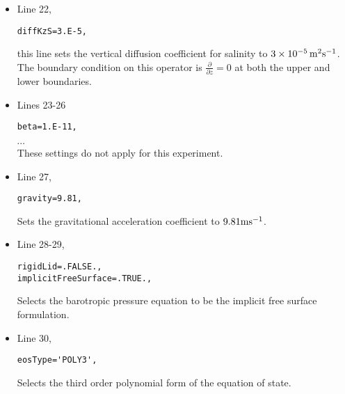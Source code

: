 {\begin{itemize}
\item Line 22,
\begin{verbatim}
diffKzS=3.E-5,
\end{verbatim}
this line sets the vertical diffusion coefficient for salinity
to $3 \times 10^{-5}\,{\rm m^{2}s^{-1}}$. The boundary 
condition on this operator is $\frac{\partial}{\partial z}=0$ at both
the upper and lower boundaries.

\item Lines 23-26
\begin{verbatim}
beta=1.E-11,
\end{verbatim}
\vspace{-5mm}$\cdots$\\
These settings do not apply for this experiment.

\item Line 27,
\begin{verbatim}
gravity=9.81,
\end{verbatim}
Sets the gravitational acceleration coefficient to $9.81{\rm m}{\rm s}^{-1}$.\\


\item Line 28-29,
\begin{verbatim}
rigidLid=.FALSE., 
implicitFreeSurface=.TRUE., 
\end{verbatim}
Selects the barotropic pressure equation to be the implicit free surface
formulation.

\item Line 30,
\begin{verbatim}
eosType='POLY3',
\end{verbatim}
Selects the third order polynomial form of the equation of state.\\


\end{itemize}}
